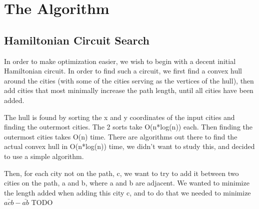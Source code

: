 \documentclass[letterpaper,11pt]{article}
\begin{document}

	\section{The Algorithm}
		\subsection{Hamiltonian Circuit Search}
			In order to make optimization easier, we wish to begin with a decent initial Hamiltonian circuit. In order to find such a circuit, we first find a convex hull around the cities (with some of the cities serving as the vertices of the hull), then add cities that most minimally increase the path length, until all cities have been added.

			The hull is found by sorting the x and y coordinates of the input cities and finding the outermost cities. The 2 sorts take O(n*log(n)) each. Then finding the outermost cities takes O(n) time. There are algorithms out there to find the actual convex hull in O(n*log(n)) time, we didn't want to study this, and decided to use a simple algorithm.

			Then, for each city not on the path, c, we want to try to add it between two cities on the path, a and b, where a and b are adjacent.  We wanted to minimize the length added when adding this city c, and to do that we needed to minimize $\bar{acb} - \bar{ab}$ TODO
\end{document}
